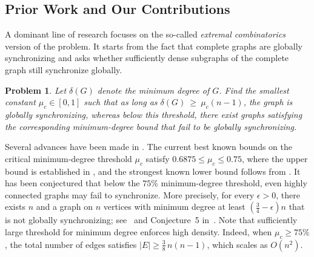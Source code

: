 \documentclass[11pt,reqno]{amsart}
\newtheorem{problem}{Problem}
\theoremstyle{definition}
\begin{document}
\subsection{Prior Work and Our Contributions} 
A dominant line of research focuses on the so-called \textit{extremal combinatorics} version of the problem.
It starts from the fact that complete graphs are globally synchronizing and asks whether sufficiently dense subgraphs of the complete graph still synchronize globally. 
\medskip

\begin{problem}
	Let $\delta(G)$ denote the minimum degree of $G$. Find the smallest constant $\mu_c\in[0,1]$ such that as long as $\delta(G)\ \ge\ \mu_c (n-1)$, the graph is globally synchronizing, whereas below this threshold, there exist graphs satisfying the corresponding minimum-degree bound that fail to be globally synchronizing.
\end{problem}
\medskip

Several advances have been made in \cite{taylor2012there, ling2019landscape, lu2021synchronization,kassabov2021sufficiently,canale2022weighted,yoneda2021lower}.
The current best known bounds on the critical minimum-degree threshold $\mu_c$ satisfy $0.6875 \le \mu_c \le 0.75$, where the upper bound is established in \cite{kassabov2021sufficiently}, and the strongest known lower bound follows from \cite{canale2022weighted}. 
It has been conjectured that below the \(75\%\) minimum-degree threshold, even
highly connected graphs may fail to synchronize. More precisely, for every
\(\epsilon>0\), there exists \(n\) and a graph on \(n\) vertices with minimum
degree at least \((\frac{3}{4}-\epsilon)n\) that is not globally
synchronizing; see~\cite{TownsendStillmanStrogatz2020} and Conjecture~5
in~\cite{bandeira2025randomstrasse101openproblems2024}.
Note that sufficiently large threshold for minimum degree enforces high density. Indeed, when $\mu_c \ge 75\%$, the total number of edges satisfies $|E| \ge \frac{3}{8}\, n(n-1)$, which scales as $O(n^2)$.
\end{document}
